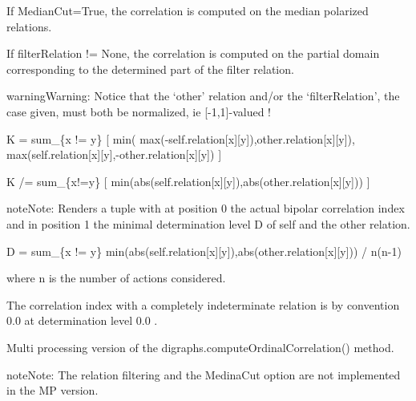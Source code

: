 \documentclass[letterpaper,10pt,english]{sphinxmanual}
\begin{document}
\begin{fulllineitems}
\begin{fulllineitems}
If MedianCut=True, the correlation is computed on the median polarized relations.

If filterRelation != None, the correlation is computed on the partial domain corresponding to the determined part of the filter relation.

\begin{notice}{warning}{Warning:}
Notice that the `other' relation and/or the `filterRelation',
the case given, must both be normalized, ie {[}-1,1{]}-valued !
\end{notice}

K = sum\_\{x != y\} {[} min( max(-self.relation{[}x{]}{[}y{]}),other.relation{[}x{]}{[}y{]}), max(self.relation{[}x{]}{[}y{]},-other.relation{[}x{]}{[}y{]}) {]}

K /= sum\_\{x!=y\} {[} min(abs(self.relation{[}x{]}{[}y{]}),abs(other.relation{[}x{]}{[}y{]})) {]}

\begin{notice}{note}{Note:}
Renders a tuple with at position 0 the actual bipolar correlation index
and in position 1 the minimal determination level D of self and
the other relation.

D = sum\_\{x != y\} min(abs(self.relation{[}x{]}{[}y{]}),abs(other.relation{[}x{]}{[}y{]})) / n(n-1)

where n is the number of actions considered.

The correlation index with a completely indeterminate relation
is by convention 0.0 at determination level 0.0 .
\end{notice}

\end{fulllineitems}


\begin{fulllineitems}
\label{techDoc:digraphs.Digraph.computeOrdinalCorrelationMP}
Multi processing version of the digraphs.computeOrdinalCorrelation() method.

\begin{notice}{note}{Note:}
The relation filtering and the MedinaCut option are not implemented in the MP version.
\end{notice}

\end{fulllineitems}


\end{fulllineitems}
\end{document}
